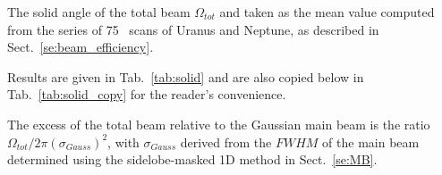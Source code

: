 The solid angle of the total beam $\Omega_{tot}$  and taken as the mean value computed from the series of 75
\bm\ scans of Uranus and Neptune, as described in Sect.~\ref{se:beam_efficiency}.

Results are given in Tab.~\ref{tab:solid} and are also
copied below in Tab.~\ref{tab:solid_copy} for the reader's convenience. 

The excess of the total beam relative to the Gaussian main beam is the ratio
$\Omega_{tot} / 2 \pi (\sigma_{Gauss})^2$, with $\sigma_{Gauss}$
derived from the $FWHM$ of the main beam determined using the
sidelobe-masked 1D method in Sect.~\ref{se:MB}.



